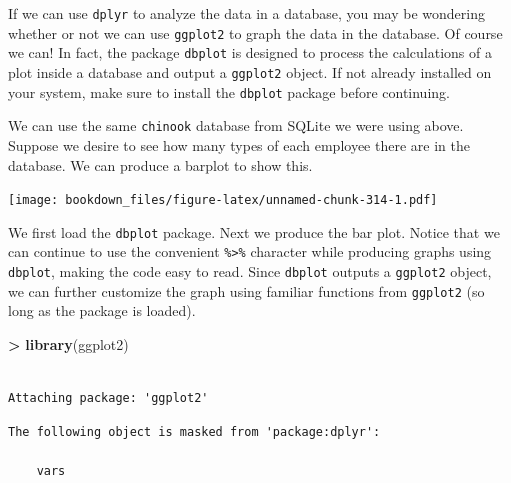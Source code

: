\documentclass[]{krantz}
\makeatletter
\newenvironment{Shaded}{\begin{snugshade}}{\end{snugshade}}
\newcommand{\KeywordTok}[1]{\textcolor[rgb]{0.27,0.27,0.27}{\textbf{#1}}}
\newcommand{\DataTypeTok}[1]{\textcolor[rgb]{0.27,0.27,0.27}{#1}}
\newcommand{\StringTok}[1]{\textcolor[rgb]{0.5,0.5,0.5}{#1}}
\newcommand{\OperatorTok}[1]{\textcolor[rgb]{0.43,0.43,0.43}{\textbf{#1}}}
\newcommand{\NormalTok}[1]{#1}
\newenvironment{kframe}{%
\medskip{}
\setlength{\fboxsep}{.8em}
 \def\at@end@of@kframe{}%
 \ifinner\ifhmode%
  \def\at@end@of@kframe{\end{minipage}}%
  \begin{minipage}{\columnwidth}%
 \fi\fi%
 \def\FrameCommand##1{\hskip\@totalleftmargin \hskip-\fboxsep
 \colorbox{shadecolor}{##1}\hskip-\fboxsep
     \hskip-\linewidth \hskip-\@totalleftmargin \hskip\columnwidth}%
 \MakeFramed {\advance\hsize-\width
   \@totalleftmargin\z@ \linewidth\hsize
   \@setminipage}}%
 {\par\unskip\endMakeFramed%
 \at@end@of@kframe}
\renewenvironment{Shaded}{\begin{kframe}}{\end{kframe}}
\makeatother
\begin{document}
If we can use \texttt{dplyr} to analyze the data in a database, you may
be wondering whether or not we can use \texttt{ggplot2} to graph the
data in the database. Of course we can! In fact, the package
\texttt{dbplot} is designed to process the calculations of a plot inside
a database and output a \texttt{ggplot2} object. If not already
installed on your system, make sure to install the \texttt{dbplot}
package before continuing.

We can use the same \texttt{chinook} database from SQLite we were using
above. Suppose we desire to see how many types of each employee there
are in the database. We can produce a barplot to show this.

\begin{Shaded}
\end{Shaded}

\texttt{[image: bookdown\_files/figure-latex/unnamed-chunk-314-1.pdf]}

We first load the \texttt{dbplot} package. Next we produce the bar plot.
Notice that we can continue to use the convenient
\texttt{\%\textgreater{}\%} character while producing graphs using
\texttt{dbplot}, making the code easy to read. Since \texttt{dbplot}
outputs a \texttt{ggplot2} object, we can further customize the graph
using familiar functions from \texttt{ggplot2} (so long as the package
is loaded).

\begin{Shaded}
\begin{Highlighting}[]
\OperatorTok{>}\StringTok{ }\KeywordTok{library}\NormalTok{(ggplot2)}
\end{Highlighting}
\end{Shaded}

\begin{verbatim}

Attaching package: 'ggplot2'
\end{verbatim}

\begin{verbatim}
The following object is masked from 'package:dplyr':

    vars
\end{verbatim}

\begin{Shaded}
\end{Shaded}
\end{document}
